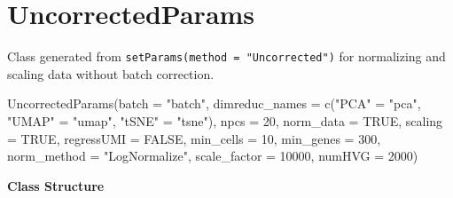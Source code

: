 \documentclass[
]{book}
\newenvironment{Shaded}{\begin{snugshade}}{\end{snugshade}}
\newcommand{\AttributeTok}[1]{\textcolor[rgb]{0.77,0.63,0.00}{#1}}
\newcommand{\ConstantTok}[1]{\textcolor[rgb]{0.00,0.00,0.00}{#1}}
\newcommand{\DecValTok}[1]{\textcolor[rgb]{0.00,0.00,0.81}{#1}}
\newcommand{\FunctionTok}[1]{\textcolor[rgb]{0.00,0.00,0.00}{#1}}
\newcommand{\NormalTok}[1]{#1}
\newcommand{\OtherTok}[1]{\textcolor[rgb]{0.56,0.35,0.01}{#1}}
\newcommand{\StringTok}[1]{\textcolor[rgb]{0.31,0.60,0.02}{#1}}
\begin{document}
\hypertarget{uncorrectedparams}{%
\section{UncorrectedParams}\label{uncorrectedparams}}

Class generated from \texttt{setParams(method\ =\ "Uncorrected")} for normalizing and scaling data without batch correction.

\begin{Shaded}
\begin{Highlighting}[]
\FunctionTok{UncorrectedParams}\NormalTok{(}\AttributeTok{batch =} \StringTok{"batch"}\NormalTok{,}
          \AttributeTok{dimreduc\_names =} \FunctionTok{c}\NormalTok{(}\StringTok{"PCA"} \OtherTok{=} \StringTok{"pca"}\NormalTok{,}
                            \StringTok{"UMAP"} \OtherTok{=} \StringTok{"umap"}\NormalTok{,}
                            \StringTok{"tSNE"} \OtherTok{=} \StringTok{"tsne"}\NormalTok{),}
          \AttributeTok{npcs =} \DecValTok{20}\NormalTok{, }
          \AttributeTok{norm\_data =} \ConstantTok{TRUE}\NormalTok{,}
          \AttributeTok{scaling =} \ConstantTok{TRUE}\NormalTok{,}
          \AttributeTok{regressUMI =} \ConstantTok{FALSE}\NormalTok{,}
          \AttributeTok{min\_cells =} \DecValTok{10}\NormalTok{,}
          \AttributeTok{min\_genes =} \DecValTok{300}\NormalTok{,}
          \AttributeTok{norm\_method =} \StringTok{"LogNormalize"}\NormalTok{,}
          \AttributeTok{scale\_factor =} \DecValTok{10000}\NormalTok{,}
          \AttributeTok{numHVG =} \DecValTok{2000}\NormalTok{)}
\end{Highlighting}
\end{Shaded}

\textbf{Class Structure}
\end{document}
